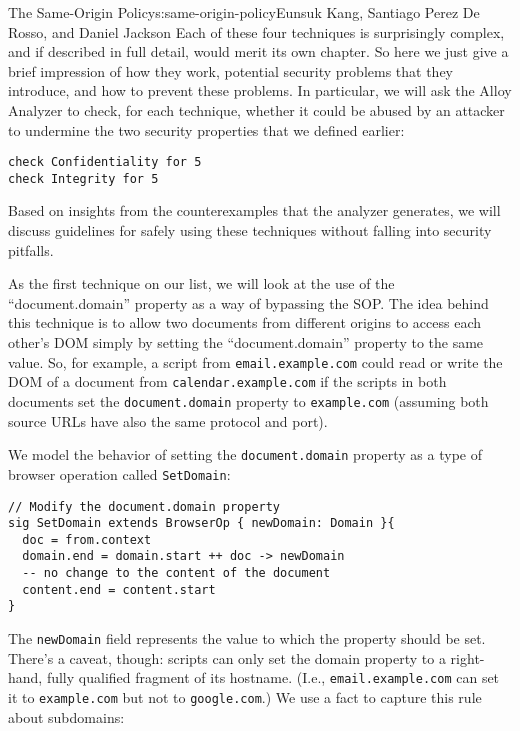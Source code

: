 \begin{aosachapter}{The Same-Origin Policy}{s:same-origin-policy}{Eunsuk Kang, Santiago Perez De Rosso, and Daniel Jackson}
Each of these four techniques is surprisingly complex, and if described
in full detail, would merit its own chapter. So here we just give a
brief impression of how they work, potential security problems that they
introduce, and how to prevent these problems. In particular, we will ask
the Alloy Analyzer to check, for each technique, whether it could be
abused by an attacker to undermine the two security properties that we
defined earlier:

\begin{verbatim}
check Confidentiality for 5
check Integrity for 5
\end{verbatim}

Based on insights from the counterexamples that the analyzer generates,
we will discuss guidelines for safely using these techniques without
falling into security pitfalls.

\label{domain-property}

As the first technique on our list, we will look at the use of the
``document.domain'' property as a way of bypassing the SOP. The idea
behind this technique is to allow two documents from different origins
to access each other's DOM simply by setting the ``document.domain''
property to the same value. So, for example, a script from
\texttt{email.example.com} could read or write the DOM of a document
from \texttt{calendar.example.com} if the scripts in both documents set
the \texttt{document.domain} property to \texttt{example.com} (assuming
both source URLs have also the same protocol and port).

We model the behavior of setting the \texttt{document.domain} property
as a type of browser operation called \texttt{SetDomain}:

\begin{verbatim}
// Modify the document.domain property
sig SetDomain extends BrowserOp { newDomain: Domain }{
  doc = from.context
  domain.end = domain.start ++ doc -> newDomain
  -- no change to the content of the document
  content.end = content.start
}
\end{verbatim}

The \texttt{newDomain} field represents the value to which the property
should be set. There's a caveat, though: scripts can only set the domain
property to a right-hand, fully qualified fragment of its hostname.
(I.e., \texttt{email.example.com} can set it to \texttt{example.com} but
not to \texttt{google.com}.) We use a fact to capture this rule about
subdomains:


\end{aosachapter}
